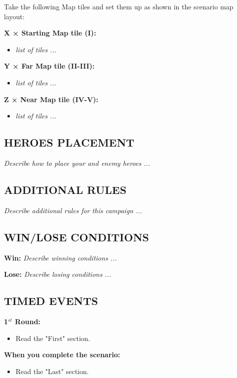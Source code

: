 \begin{multicols*}{2}
Take the following Map tiles and set them up as shown in the scenario map layout:

\textbf{X × Starting Map tile (I):}
\begin{itemize}
    \item \textit{list of tiles ...}
\end{itemize}

\textbf{Y × Far Map tile (II-III):}
\begin{itemize}
    \item \textit{list of tiles ...}
\end{itemize}

\textbf{Z × Near Map tile (IV-V):}
\begin{itemize}
    \item \textit{list of tiles ...}
\end{itemize}

\subsection*{\MakeUppercase{Heroes placement}}

\textit{Describe how to place your and enemy heroes ...}

\subsection*{\MakeUppercase{Additional rules}}

\textit{Describe additional rules for this campaign ...}

\subsection*{\MakeUppercase{Win/lose conditions}}

\textbf{Win:} \textit{Describe winning conditions ...}

\textbf{Lose:} \textit{Describe losing conditions ...}

\subsection*{\MakeUppercase{Timed events}}

\textbf{1$^{st}$ Round:}
\begin{itemize}
    \item Read the "First" section.
\end{itemize}

\textbf{When you complete the scenario:}
\begin{itemize}
    \item Read the "Last" section.
\end{itemize}


\end{multicols*}
